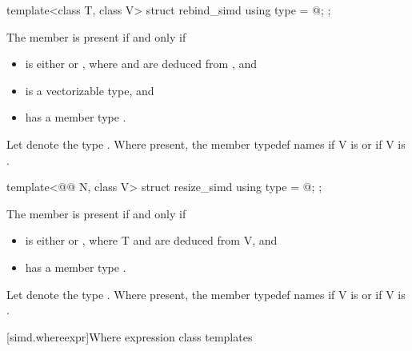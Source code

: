\begin{itemdecl}
template<class T, class V> struct rebind_simd { using type = @\seebelow@; };
\end{itemdecl}

\begin{itemdescr}
  \pnum
  The member  is present if and only if
  \begin{itemize}
    \item {} is either  or , where  and  are deduced from , and
    \item {} is a vectorizable type, and
    \item {} has a member type .
  \end{itemize}

  \pnum
  Let  denote the type .
  Where present, the member typedef  names
   if \tcode V is  or
   if \tcode V is .
\end{itemdescr}

\begin{itemdecl}
template<@@ N, class V> struct resize_simd { using type = @\seebelow@; };
\end{itemdecl}

\begin{itemdescr}
  \pnum
  The member  is present if and only if
  \begin{itemize}
    \item {} is either  or , where \tcode T and  are deduced from \tcode V, and
    \item {} has a member type .
  \end{itemize}

  \pnum
  Let  denote the type .
  Where present, the member typedef  names  if \tcode V is  or  if \tcode V is .
\end{itemdescr}

[simd.whereexpr]{Where expression class templates}

